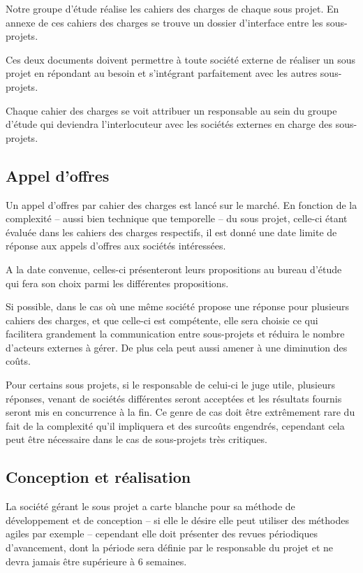 \documentclass[a4paper, 11pt, draft]{report}
\begin{document}
Notre groupe d'étude réalise les cahiers des charges de chaque sous projet. En annexe de ces cahiers des charges se trouve un dossier d'interface entre les sous-projets.

Ces deux documents doivent permettre à toute société externe de réaliser un sous projet en répondant au besoin et s'intégrant parfaitement avec les autres sous-projets.

Chaque cahier des charges se voit attribuer un responsable au sein du groupe d'étude qui deviendra l'interlocuteur avec les sociétés externes en charge des sous-projets.

\subsection{Appel d'offres}

Un appel d'offres par cahier des charges est lancé sur le marché. En fonction de la complexité -- aussi bien technique que temporelle -- du sous projet, celle-ci étant évaluée dans les cahiers des charges respectifs, il est donné une date limite de réponse aux appels d'offres aux sociétés intéressées.

A la date convenue, celles-ci présenteront leurs propositions au bureau d'étude qui fera son choix parmi les différentes propositions.

Si possible, dans le cas où une même société propose une réponse pour plusieurs cahiers des charges, et que celle-ci est compétente, elle sera choisie ce qui facilitera grandement la communication entre sous-projets et réduira le nombre d'acteurs externes à gérer. De plus cela peut aussi amener à une diminution des coûts.

Pour certains sous projets, si le responsable de celui-ci le juge utile, plusieurs réponses, venant de sociétés différentes seront acceptées et les résultats fournis seront mis en concurrence à la fin. Ce genre de cas doit être extrêmement rare du fait de la complexité qu'il impliquera et des surcoûts engendrés, cependant cela peut être nécessaire dans le cas de sous-projets très critiques.


\subsection{Conception et réalisation}

La société gérant le sous projet a carte blanche pour sa méthode de développement et de conception -- si elle le désire elle peut utiliser des méthodes agiles par exemple -- cependant elle doit présenter des revues périodiques d'avancement, dont la période sera définie par le responsable du projet et ne devra jamais être supérieure à 6 semaines.
\end{document}

